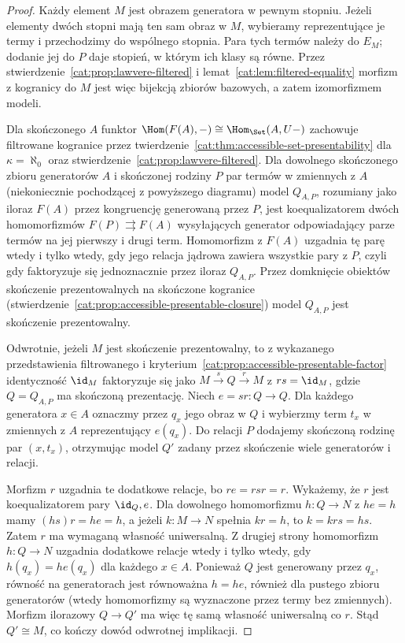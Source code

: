 \begin{proof}
Każdy element $M$ jest obrazem generatora w pewnym stopniu. Jeżeli elementy dwóch stopni mają ten sam obraz w $M$, wybieramy reprezentujące je termy i przechodzimy do wspólnego stopnia. Para tych termów należy do $E_M$; dodanie jej do $P$ daje stopień, w którym ich klasy są równe. Przez stwierdzenie~\ref{cat:prop:lawvere-filtered} i lemat~\ref{cat:lem:filtered-equality} morfizm z kogranicy do $M$ jest więc bijekcją zbiorów bazowych, a zatem izomorfizmem modeli.

Dla skończonego $A$ funktor $\Hom(F(A),-)\cong\Hom_{\Set}(A,U-)$ zachowuje filtrowane kogranice przez twierdzenie~\ref{cat:thm:accessible-set-presentability} dla $\kappa=\aleph_0$ oraz stwierdzenie~\ref{cat:prop:lawvere-filtered}. Dla dowolnego skończonego zbioru generatorów $A$ i skończonej rodziny $P$ par termów w zmiennych z $A$ (niekoniecznie pochodzącej z powyższego diagramu) model $Q_{A,P}$, rozumiany jako iloraz $F(A)$ przez kongruencję generowaną przez $P$, jest koequalizatorem dwóch homomorfizmów $F(P)\rightrightarrows F(A)$ wysyłających generator odpowiadający parze termów na jej pierwszy i drugi term. Homomorfizm z $F(A)$ uzgadnia tę parę wtedy i tylko wtedy, gdy jego relacja jądrowa zawiera wszystkie pary z $P$, czyli gdy faktoryzuje się jednoznacznie przez iloraz $Q_{A,P}$. Przez domknięcie obiektów skończenie prezentowalnych na skończone kogranice (stwierdzenie~\ref{cat:prop:accessible-presentable-closure}) model $Q_{A,P}$ jest skończenie prezentowalny.

Odwrotnie, jeżeli $M$ jest skończenie prezentowalny, to z wykazanego przedstawienia filtrowanego i kryterium~\ref{cat:prop:accessible-presentable-factor} identyczność $\id_M$ faktoryzuje się jako $M\xrightarrow{s}Q\xrightarrow{r}M$ z $rs=\id_M$, gdzie $Q=Q_{A,P}$ ma skończoną prezentację. Niech $e=sr:Q\to Q$. Dla każdego generatora $x\in A$ oznaczmy przez $q_x$ jego obraz w $Q$ i wybierzmy term $t_x$ w zmiennych z $A$ reprezentujący $e(q_x)$. Do relacji $P$ dodajemy skończoną rodzinę par $(x,t_x)$, otrzymując model $Q'$ zadany przez skończenie wiele generatorów i relacji.

Morfizm $r$ uzgadnia te dodatkowe relacje, bo $re=rsr=r$. Wykażemy, że $r$ jest koequalizatorem pary $\id_Q,e$. Dla dowolnego homomorfizmu $h:Q\to N$ z $he=h$ mamy $(hs)r=he=h$, a jeżeli $k:M\to N$ spełnia $kr=h$, to $k=krs=hs$. Zatem $r$ ma wymaganą własność uniwersalną. Z drugiej strony homomorfizm $h:Q\to N$ uzgadnia dodatkowe relacje wtedy i tylko wtedy, gdy $h(q_x)=he(q_x)$ dla każdego $x\in A$. Ponieważ $Q$ jest generowany przez $q_x$, równość na generatorach jest równoważna $h=he$, również dla pustego zbioru generatorów (wtedy homomorfizmy są wyznaczone przez termy bez zmiennych). Morfizm ilorazowy $Q\to Q'$ ma więc tę samą własność uniwersalną co $r$. Stąd $Q'\cong M$, co kończy dowód odwrotnej implikacji.
\end{proof}


